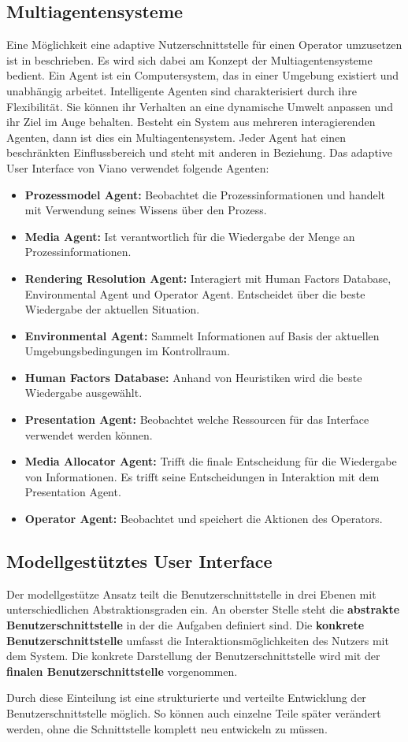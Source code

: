 \subsection{Multiagentensysteme}
Eine Möglichkeit eine adaptive Nutzerschnittstelle für einen Operator umzusetzen ist in \cite{Viano2000} beschrieben. Es wird sich dabei am Konzept der Multiagentensysteme  bedient. Ein Agent ist ein Computersystem, das in einer Umgebung existiert und unabhängig arbeitet. Intelligente Agenten sind charakterisiert durch ihre Flexibilität. Sie können ihr Verhalten an eine dynamische Umwelt anpassen und ihr Ziel im Auge behalten. Besteht ein System aus mehreren interagierenden Agenten, dann ist dies ein Multiagentensystem. Jeder Agent hat einen beschränkten Einflussbereich und steht mit anderen in Beziehung. Das adaptive User Interface von Viano \cite{Viano2000} verwendet folgende Agenten:
\begin{itemize}
\item \textbf{Prozessmodel Agent:} Beobachtet die Prozessinformationen und handelt mit Verwendung seines Wissens über den Prozess.
\item \textbf{Media Agent:} Ist verantwortlich für die Wiedergabe der Menge an Prozessinformationen.
\item \textbf{Rendering Resolution Agent:} Interagiert mit Human Factors Database, Environmental Agent und Operator Agent. Entscheidet über die beste Wiedergabe der aktuellen Situation.
\item \textbf{Environmental Agent:} Sammelt Informationen auf Basis der aktuellen Umgebungsbedingungen im Kontrollraum.
\item \textbf{Human Factors Database:} Anhand von Heuristiken wird die beste Wiedergabe ausgewählt.
\item \textbf{Presentation Agent:} Beobachtet welche Ressourcen für das Interface verwendet werden können.
\item \textbf{Media Allocator Agent:} Trifft die finale Entscheidung für die Wiedergabe von Informationen. Es trifft seine Entscheidungen in Interaktion mit dem Presentation Agent.
\item \textbf{Operator Agent:} Beobachtet und speichert die Aktionen des Operators.
\end{itemize}

\subsection{Modellgestütztes User Interface}
Der modellgestütze Ansatz teilt die Benutzerschnittstelle in drei Ebenen mit unterschiedlichen Abstraktionsgraden ein. An oberster Stelle steht die \textbf{abstrakte Benutzerschnittstelle} in der die Aufgaben definiert sind. Die \textbf{konkrete Benutzerschnittstelle} umfasst die Interaktionsmöglichkeiten des Nutzers mit dem System. Die konkrete Darstellung der Benutzerschnittstelle wird mit der \textbf{finalen Benutzerschnittstelle} vorgenommen. \cite{Meixner2011, Park2015}

Durch diese Einteilung ist eine strukturierte und verteilte Entwicklung der Benutzerschnittstelle möglich. So können auch einzelne Teile später verändert werden, ohne die Schnittstelle komplett neu entwickeln zu müssen. \cite{Meixner2011}

